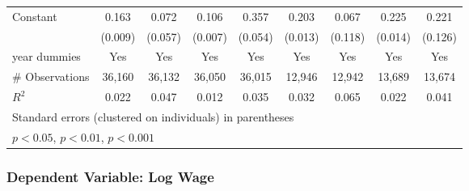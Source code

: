 \begin{sidewaystable}
\begin{tabular}{l*{2}{c}| *{2}{c}| *{2}{c}| *{2}{c}}
	Constant            &       0.163\sym{***}&       0.072         &       0.106\sym{***}&       0.357\sym{***}&       0.203\sym{***}&       0.067         &       0.225\sym{***}&       0.221         \\
	&     (0.009)         &     (0.057)         &     (0.007)         &     (0.054)         &     (0.013)         &     (0.118)         &     (0.014)         &     (0.126)         \\
	year dummies        &         Yes         &         Yes         &         Yes         &         Yes         &         Yes         &         Yes         &         Yes         &         Yes         \\
	\midrule
\#	Observations        &       36,160         &       36,132         &       36,050         &       36,015         &       12,946         &       12,942         &       13,689         &       13,674         \\
	 \(R^{2}\)  &       0.022         &       0.047         &       0.012         &       0.035         &       0.032         &       0.065         &       0.022         &       0.041         \\
	\bottomrule
	\multicolumn{9}{l}{\footnotesize Standard errors (clustered on individuals) in parentheses}\\
	\multicolumn{9}{l}{\footnotesize \sym{*} \(p<0.05\), \sym{**} \(p<0.01\), \sym{***} \(p<0.001\)}
\end{tabular}
\end{sidewaystable}
\clearpage

\subsubsection{Dependent Variable: Log Wage}
\label{sec:wage_full}


